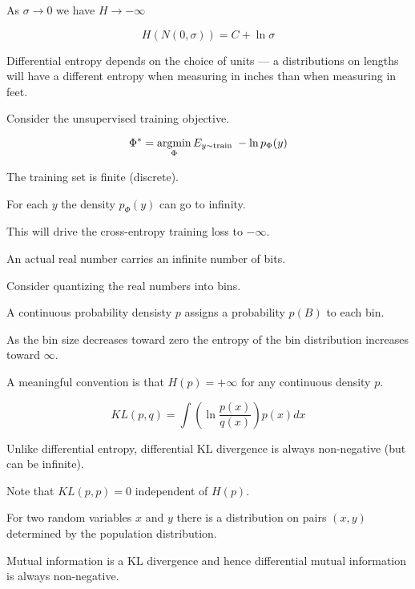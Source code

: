 {\vfill
\centerline{As $\sigma \rightarrow 0$ we have $H \rightarrow -\infty$}


$$H(N(0,\sigma)) = C + \ln \sigma$$

\vfill
Differential entropy depends on the choice of units --- a distributions on lengths will have a different entropy
when measuring in inches than when measuring in feet.


Consider the unsupervised training objective.

$$\Phi^* = \operatorname*{argmin}_\Phi E_{y \sim \mathrm{train}}\;-\ln p_\Phi(y)$$

\vfill
The training set is finite (discrete).

\vfill
For each $y$ the density $p_\Phi(y)$ can go to infinity.

\vfill
This will drive the cross-entropy training loss to $-\infty$.



An actual real number carries an infinite number of bits.

\vfill
Consider quantizing the real numbers into bins.

\vfill
A continuous probability densisty $p$ assigns a probability $p(B)$ to each bin.

\vfill
As the bin size decreases toward zero the entropy of the bin distribution increases toward $\infty$.

\vfill
A meaningful convention is that $H(p) = +\infty$ for any continuous density $p$.


$$KL(p,q) = \int \left( \ln \frac{p(x)}{q(x)}\right) p(x) dx$$

\vfill
Unlike differential entropy, differential KL divergence is always non-negative (but can be infinite).

\vfill
Note that $KL(p,p) = 0$ independent of $H(p)$.


For two random variables $x$ and $y$ there is a distribution on pairs $(x,y)$ determined by the population distribution.

\vfill
Mutual information is a KL divergence and hence differential mutual information is always non-negative.

}
